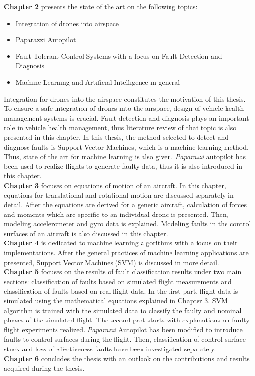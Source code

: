 \textbf{Chapter 2} presents the state of the art on the following topics: 
\begin{itemize}
\item{Integration of drones into airspace}
\item{Paparazzi Autopilot}
\item{Fault Tolerant Control Systems with a focus on Fault Detection and Diagnosis}
\item{Machine Learning and Artificial Intelligence in general}
\end{itemize}
Integration for drones into the airspace constitutes the motivation of this thesis. To ensure a safe integration of drones into the airspace, design of vehicle health management systems is crucial. Fault detection and diagnosis plays an important role in vehicle health management, thus literature review of that topic is also presented in this chapter. In this thesis, the method selected to detect and diagnose faults is Support Vector Machines, which is a machine learning method. Thus, state of the art for machine learning is also given. \emph{Paparazzi} autopilot has been used to realize flights to generate faulty data, thus it is also introduced in this chapter.\\
\textbf{Chapter 3} focuses on equations of motion of an aircraft. In this chapter, equations for translational and rotational motion are discussed separately in detail. After the equations are derived for a generic aircraft, calculation of forces and moments which are specific to an individual drone is presented. Then, modeling accelerometer and gyro data is explained. Modeling faults in the control surfaces of an aircraft is also discussed in this chapter.\\
\textbf{Chapter 4} is dedicated to machine learning algorithms with a focus on their implementations. After the general practices of machine learning applications are presented, Support Vector Machines (SVM) is discussed in more detail.\\
\textbf{Chapter 5} focuses on the results of fault classification results under two main sections: classification of faults based on simulated  flight measurements and classification of faults based on real flight data. In the first part, flight data is simulated using the mathematical equations explained in Chapter 3. SVM algorithm is trained with the simulated data to classify the faulty and nominal phases of the simulated flight. The second part starts with explanations on faulty flight experiments realized. \emph{Paparazzi} Autopilot has been modified to introduce faults to control surfaces during the flight. Then, classification of control surface stuck and loss of effectiveness faults have been investigated separately.\\
\textbf{Chapter 6} concludes the thesis with an outlook on the contributions and results acquired during the thesis.